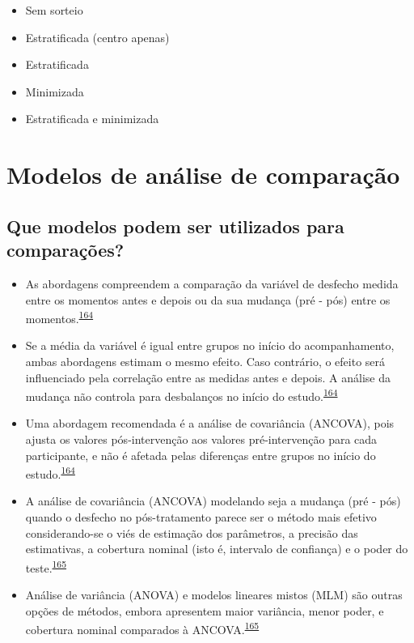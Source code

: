 \documentclass[
  a4paper,
]{book}
\begin{document}
\begin{itemize}
  \begin{itemize}
  \item
    Sem sorteio
  \item
    Estratificada (centro apenas)
  \item
    Estratificada
  \item
    Minimizada
  \item
    Estratificada e minimizada
  \end{itemize}
\end{itemize}

\hypertarget{metodos-comparacao}{%
\section{Modelos de análise de comparação}\label{metodos-comparacao}}

\hypertarget{que-modelos-podem-ser-utilizados-para-comparauxe7uxf5es}{%
\subsection{Que modelos podem ser utilizados para comparações?}\label{que-modelos-podem-ser-utilizados-para-comparauxe7uxf5es}}

\begin{itemize}
\item
  As abordagens compreendem a comparação da variável de desfecho medida entre os momentos antes e depois ou da sua mudança (pré - pós) entre os momentos.\textsuperscript{\protect\hyperlink{ref-Vickers2001}{164}}
\item
  Se a média da variável é igual entre grupos no início do acompanhamento, ambas abordagens estimam o mesmo efeito. Caso contrário, o efeito será influenciado pela correlação entre as medidas antes e depois. A análise da mudança não controla para desbalanços no início do estudo.\textsuperscript{\protect\hyperlink{ref-Vickers2001}{164}}
\item
  Uma abordagem recomendada é a análise de covariância (ANCOVA), pois ajusta os valores pós-intervenção aos valores pré-intervenção para cada participante, e não é afetada pelas diferenças entre grupos no início do estudo.\textsuperscript{\protect\hyperlink{ref-Vickers2001}{164}}
\item
  A análise de covariância (ANCOVA) modelando seja a mudança (pré - pós) quando o desfecho no pós-tratamento parece ser o método mais efetivo considerando-se o viés de estimação dos parâmetros, a precisão das estimativas, a cobertura nominal (isto é, intervalo de confiança) e o poder do teste.\textsuperscript{\protect\hyperlink{ref-OConnell2017}{165}}
\item
  Análise de variância (ANOVA) e modelos lineares mistos (MLM) são outras opções de métodos, embora apresentem maior variância, menor poder, e cobertura nominal comparados à ANCOVA.\textsuperscript{\protect\hyperlink{ref-OConnell2017}{165}}
\end{itemize}
\end{document}
